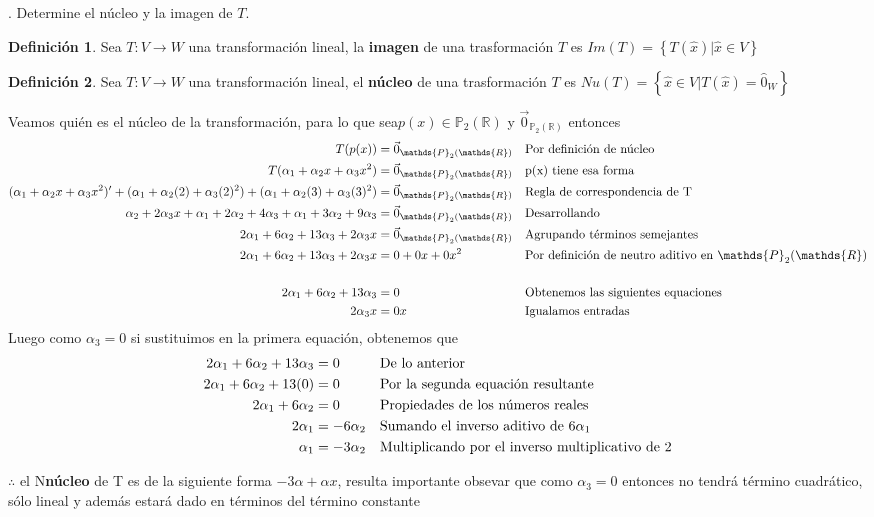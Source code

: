 \documentclass[letterpaper]{article}
\newcommand{\Po}{\mathds{P}_2(\mathds{R})}
\renewcommand{\*}{\cdot}
\theoremstyle{definition}
\newtheorem{definition}{Definición}
\begin{document}
. Determine el núcleo y la imagen de $T$.

\begin{definition}
Sea $ T: V \rightarrow W $ una transformación lineal, la \textbf{imagen} de una trasformación $ T $ es $Im(T) = \left\lbrace T(\hat{x}) | \hat{x} \in V  \right\rbrace$
\end{definition}
\begin{definition}
Sea $ T: V \rightarrow W $ una transformación lineal, el \textbf{núcleo} de una trasformación $ T $ es $Nu(T) = \left\lbrace \hat{x} \in V | T(\hat{x}) = \hat{0}_{W}  \right\rbrace$
\end{definition}
Veamos quién es el núcleo de la transformación, para lo que  sea$ p(x) \in \Po$ y $ \vec{0}_{\Po} $ entonces
\begin{align*}
	T(p(x)) &= \vec{0}_{\Po} && \text{Por definición de núcleo}\\
	T(\alpha_1 + \alpha_2x + \alpha_3x^2) &= \vec{0}_{\Po} && \text{p(x) tiene esa forma}\\
	(\alpha_1 + \alpha_2x + \alpha_3x^2)' + (\alpha_1 + \alpha_2(2) + \alpha_3(2)^2) + (\alpha_1 + \alpha_2(3) + \alpha_3(3)^2) &= \vec{0}_{\Po} && \text{Regla de correspondencia de T}\\
	\alpha_2 + 2\alpha_3x + \alpha_1 + 2\alpha_2 + 4\alpha_3 + \alpha_1  +3\alpha_2 + 9\alpha_3 &= \vec{0}_{\Po} && \text{Desarrollando}\\
	2\alpha_1  + 6\alpha_2 + 13\alpha_3 + 2\alpha_3x &= \vec{0}_{\Po} && \text{Agrupando términos semejantes}\\
	2\alpha_1  + 6\alpha_2 + 13\alpha_3 + 2\alpha_3x &= 0 + 0x + 0 x^2 && \text{Por definición de neutro aditivo en $ \Po $}\\
	\\
	2\alpha_1  + 6\alpha_2 + 13\alpha_3 &= 0  && \text{Obtenemos las siguientes equaciones}\\
	 2\alpha_3x &= 0x  && \text{Igualamos entradas}\\
\end{align*}
Luego como $ \alpha_3 = 0 $ si sustituimos en la primera equación, obtenemos que
\begin{align*}
		2\alpha_1  + 6\alpha_2 + 13\alpha_3 &= 0 && \text{De lo anterior}\\
		2\alpha_1  + 6\alpha_2 + 13(0) &= 0 && \text{Por la segunda equación resultante}\\
		2\alpha_1  + 6\alpha_2 &= 0 && \text{Propiedades de los números reales}\\
		2\alpha_1  &= -6\alpha_2 && \text{Sumando el inverso aditivo de $ 6\alpha_1 $}\\
		\alpha_1  &= -3\alpha_2 && \text{Multiplicando por  el inverso multiplicativo de 2}\\
\end{align*}
\begin{center}
	$ \therefore $ el N\textbf{núcleo} de T es de la siguiente forma $ -3\alpha + \alpha x $, resulta importante obsevar que como $ \alpha_3 = 0 $ entonces no tendrá término cuadrático, sólo lineal y además estará dado en términos del término constante
\end{center}
\end{document}
